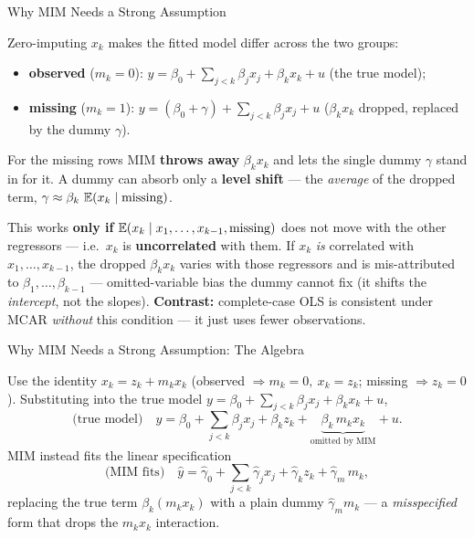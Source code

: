 \documentclass[aspectratio=169, 12pt]{beamer}
\begin{document}
\begin{frame}[shrink=8]{Why MIM Needs a Strong Assumption}

  Zero-imputing $x_k$ makes the fitted model differ across the two groups:
  \begin{itemize}\setlength{\itemsep}{2pt}
    \item \textbf{observed} ($m_k=0$):
      $y = \beta_0 + \sum_{j<k}\beta_j x_j + \beta_k x_k + u$ \quad(the true model);
    \item \textbf{missing} ($m_k=1$):
      $y = (\beta_0+\gamma) + \sum_{j<k}\beta_j x_j + u$ \quad($\beta_k x_k$ dropped,
      replaced by the dummy $\gamma$).
  \end{itemize}

  \begin{keybox}
    For the missing rows MIM \textbf{throws away} $\beta_k x_k$ and lets the single dummy
    $\gamma$ stand in for it. A dummy can absorb only a \textbf{level shift} --- the
    \emph{average} of the dropped term, $\gamma \approx \beta_k\,\operatorname{\mathbb{E}}(x_k \mid \text{missing})$.
  \end{keybox}

  \begin{highlightbox}
    This works \textbf{only if} $\operatorname{\mathbb{E}}(x_k \mid x_1,\dots,x_{k-1},\text{missing})$ does not
    move with the other regressors --- i.e.\ $x_k$ is \textbf{uncorrelated} with them. If
    $x_k$ \emph{is} correlated with $x_1,\dots,x_{k-1}$, the dropped $\beta_k x_k$ varies
    with those regressors and is mis-attributed to $\beta_1,\dots,\beta_{k-1}$ ---
    omitted-variable bias the dummy cannot fix (it shifts the \emph{intercept}, not the
    slopes). \textbf{Contrast:} complete-case OLS is consistent under MCAR \emph{without}
    this condition --- it just uses fewer observations.
  \end{highlightbox}

\end{frame}

\begin{frame}{Why MIM Needs a Strong Assumption: The Algebra}

  Use the identity $x_k = z_k + m_k x_k$ (observed $\Rightarrow m_k = 0,\ x_k = z_k$;
  missing $\Rightarrow z_k = 0$). Substituting into the true model
  $y = \beta_0 + \sum_{j<k}\beta_j x_j + \beta_k x_k + u$,
  \[
    \text{(true model)}\quad
    y = \beta_0 + \sum_{j<k}\beta_j x_j + \beta_k z_k
        + \underbrace{\beta_k\, m_k x_k}_{\text{omitted by MIM}} + u .
  \]
  MIM instead fits the linear specification
  \[
    \text{(MIM fits)}\quad
    \hat{y} = \hat\gamma_0 + \sum_{j<k}\hat\gamma_j x_j + \hat\gamma_k z_k
              + \hat\gamma_m\, m_k ,
  \]
  replacing the true term $\beta_k(m_k x_k)$ with a plain dummy $\hat\gamma_m m_k$ --- a
  \emph{misspecified} form that drops the $m_k x_k$ interaction.

\end{frame}
\end{document}
